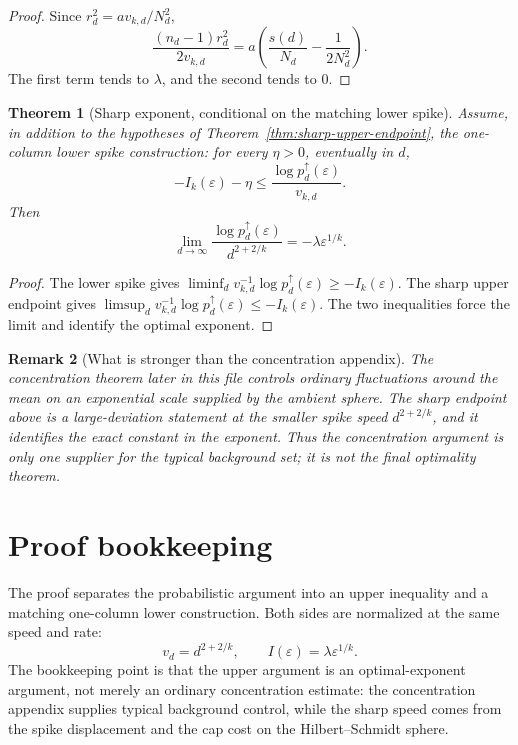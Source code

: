 \documentclass[11pt,reqno]{amsart}
\newtheorem{theorem}{Theorem}[section]
\newtheorem{remark}[theorem]{Remark}
\newenvironment{revverified}{\begingroup\color{RevisionVerified}}{\endgroup}
\newenvironment{revnewmath}{\begingroup\color{RevisionNewMath}}{\endgroup}
\begin{document}
\begin{revnewmath}
\begin{proof}
Since \(r_d^2=a v_{k,d}/N_d^2\),
\[
  \frac{(n_d-1)r_d^2}{2v_{k,d}}
  =
  a\left(\frac{s(d)}{N_d}-\frac{1}{2N_d^2}\right).
\]
The first term tends to \(\lambda\), and the second tends to \(0\).
\end{proof}

\begin{theorem}[Sharp exponent, conditional on the matching lower spike]
\label{thm:sharp-optimal-exponent}
Assume, in addition to the hypotheses of
Theorem~\ref{thm:sharp-upper-endpoint}, the one-column lower spike
construction: for every \(\eta>0\), eventually in \(d\),
\[
  -I_k(\varepsilon)-\eta
  \le
  \frac{\log p_d^\uparrow(\varepsilon)}{v_{k,d}} .
\]
Then
\[
  \lim_{d\to\infty}
  \frac{\log p_d^\uparrow(\varepsilon)}{d^{2+2/k}}
  =
  -\lambda\varepsilon^{1/k}.
\]
\end{theorem}

\begin{proof}
The lower spike gives
\(\liminf_d v_{k,d}^{-1}\log p_d^\uparrow(\varepsilon)
\ge -I_k(\varepsilon)\).  The sharp upper endpoint gives
\(\limsup_d v_{k,d}^{-1}\log p_d^\uparrow(\varepsilon)
\le -I_k(\varepsilon)\).  The two inequalities force the limit and identify
the optimal exponent.
\end{proof}

\begin{remark}[What is stronger than the concentration appendix]
The concentration theorem later in this file controls ordinary fluctuations
around the mean on an exponential scale supplied by the ambient sphere.  The
sharp endpoint above is a large-deviation statement at the smaller spike
speed \(d^{2+2/k}\), and it identifies the exact constant in the exponent.
Thus the concentration argument is only one supplier for the typical
background set; it is not the final optimality theorem.
\end{remark}
\end{revnewmath}

\begin{revverified}
\section{Proof bookkeeping}
\label{sec:proof-bookkeeping}

The proof separates the probabilistic argument into an upper inequality and a
matching one-column lower construction.  Both sides are normalized at the same
speed and rate:
\[
  v_d=d^{2+2/k},
  \qquad
  I(\varepsilon)=\lambda\varepsilon^{1/k}.
\]
The bookkeeping point is that the upper argument is an optimal-exponent
argument, not merely an ordinary concentration estimate: the concentration
appendix supplies typical background control, while the sharp speed comes from
the spike displacement and the cap cost on the Hilbert--Schmidt sphere.
\end{revverified}
\end{document}
